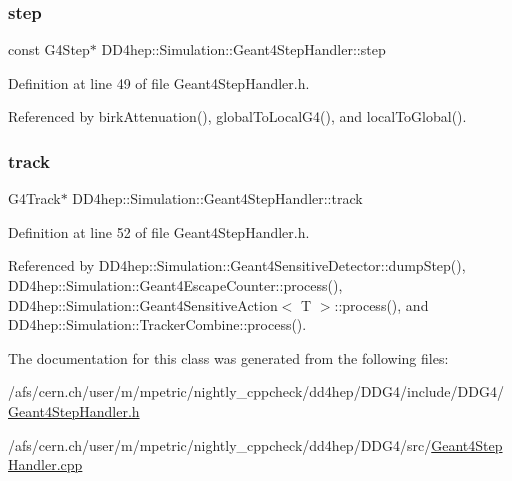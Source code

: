 \hypertarget{class_d_d4hep_1_1_simulation_1_1_geant4_step_handler_a5f8ecf6b8e58ab857df4d639d9b8f235}{}\label{class_d_d4hep_1_1_simulation_1_1_geant4_step_handler_a5f8ecf6b8e58ab857df4d639d9b8f235} 
\subsubsection{\texorpdfstring{step}{step}}
{\footnotesize\ttfamily const G4\+Step$\ast$ D\+D4hep\+::\+Simulation\+::\+Geant4\+Step\+Handler\+::step}



Definition at line 49 of file Geant4\+Step\+Handler.\+h.



Referenced by birk\+Attenuation(), global\+To\+Local\+G4(), and local\+To\+Global().

\hypertarget{class_d_d4hep_1_1_simulation_1_1_geant4_step_handler_a8bb7d5d357693c499d319fdc1fa3b34b}{}\label{class_d_d4hep_1_1_simulation_1_1_geant4_step_handler_a8bb7d5d357693c499d319fdc1fa3b34b} 
\subsubsection{\texorpdfstring{track}{track}}
{\footnotesize\ttfamily G4\+Track$\ast$ D\+D4hep\+::\+Simulation\+::\+Geant4\+Step\+Handler\+::track}



Definition at line 52 of file Geant4\+Step\+Handler.\+h.



Referenced by D\+D4hep\+::\+Simulation\+::\+Geant4\+Sensitive\+Detector\+::dump\+Step(), D\+D4hep\+::\+Simulation\+::\+Geant4\+Escape\+Counter\+::process(), D\+D4hep\+::\+Simulation\+::\+Geant4\+Sensitive\+Action$<$ T $>$\+::process(), and D\+D4hep\+::\+Simulation\+::\+Tracker\+Combine\+::process().



The documentation for this class was generated from the following files\+:\begin{DoxyCompactItemize}
\item 
/afs/cern.\+ch/user/m/mpetric/nightly\+\_\+cppcheck/dd4hep/\+D\+D\+G4/include/\+D\+D\+G4/\hyperlink{_geant4_step_handler_8h}{Geant4\+Step\+Handler.\+h}\item 
/afs/cern.\+ch/user/m/mpetric/nightly\+\_\+cppcheck/dd4hep/\+D\+D\+G4/src/\hyperlink{_geant4_step_handler_8cpp}{Geant4\+Step\+Handler.\+cpp}\end{DoxyCompactItemize}

